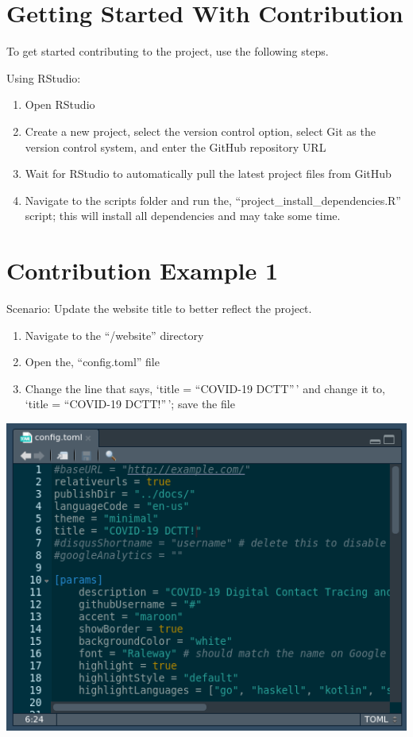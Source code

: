 \documentclass[
]{book}
\providecommand{\tightlist}{%
  \setlength{\itemsep}{0pt}\setlength{\parskip}{0pt}}
\begin{document}
\hypertarget{getting-started-with-contribution}{%
\section{Getting Started With Contribution}\label{getting-started-with-contribution}}

To get started contributing to the project, use the following steps.

Using RStudio:

\begin{enumerate}
\def\labelenumi{\arabic{enumi}.}
\tightlist
\item
  Open RStudio
\item
  Create a new project, select the version control option, select Git as the version control system, and enter the GitHub repository URL
\item
  Wait for RStudio to automatically pull the latest project files from GitHub
\item
  Navigate to the scripts folder and run the, ``project\_install\_dependencies.R'' script; this will install all dependencies and may take some time.
\end{enumerate}

\hypertarget{contribution-example-1}{%
\section{Contribution Example 1}\label{contribution-example-1}}

Scenario: Update the website title to better reflect the project.

\begin{enumerate}
\def\labelenumi{\arabic{enumi}.}
\tightlist
\item
  Navigate to the ``/website'' directory
\item
  Open the, ``config.toml'' file
\item
  Change the line that says, `title = ``COVID-19 DCTT''\,' and change it to, `title = ``COVID-19 DCTT!''\,'; save the file
\end{enumerate}

\includegraphics{images/04-example1_1.png}
\end{document}
